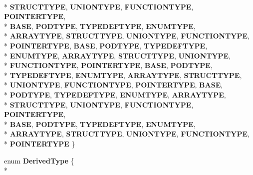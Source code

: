 \begin{DoxyCompactItemize}
\\*
{\bfseries S\-T\-R\-U\-C\-T\-T\-Y\-P\-E}, 
{\bfseries U\-N\-I\-O\-N\-T\-Y\-P\-E}, 
{\bfseries F\-U\-N\-C\-T\-I\-O\-N\-T\-Y\-P\-E}, 
{\bfseries P\-O\-I\-N\-T\-E\-R\-T\-Y\-P\-E}, 
\\*
{\bfseries B\-A\-S\-E}, 
{\bfseries P\-O\-D\-T\-Y\-P\-E}, 
{\bfseries T\-Y\-P\-E\-D\-E\-F\-T\-Y\-P\-E}, 
{\bfseries E\-N\-U\-M\-T\-Y\-P\-E}, 
\\*
{\bfseries A\-R\-R\-A\-Y\-T\-Y\-P\-E}, 
{\bfseries S\-T\-R\-U\-C\-T\-T\-Y\-P\-E}, 
{\bfseries U\-N\-I\-O\-N\-T\-Y\-P\-E}, 
{\bfseries F\-U\-N\-C\-T\-I\-O\-N\-T\-Y\-P\-E}, 
\\*
{\bfseries P\-O\-I\-N\-T\-E\-R\-T\-Y\-P\-E}, 
{\bfseries B\-A\-S\-E}, 
{\bfseries P\-O\-D\-T\-Y\-P\-E}, 
{\bfseries T\-Y\-P\-E\-D\-E\-F\-T\-Y\-P\-E}, 
\\*
{\bfseries E\-N\-U\-M\-T\-Y\-P\-E}, 
{\bfseries A\-R\-R\-A\-Y\-T\-Y\-P\-E}, 
{\bfseries S\-T\-R\-U\-C\-T\-T\-Y\-P\-E}, 
{\bfseries U\-N\-I\-O\-N\-T\-Y\-P\-E}, 
\\*
{\bfseries F\-U\-N\-C\-T\-I\-O\-N\-T\-Y\-P\-E}, 
{\bfseries P\-O\-I\-N\-T\-E\-R\-T\-Y\-P\-E}, 
{\bfseries B\-A\-S\-E}, 
{\bfseries P\-O\-D\-T\-Y\-P\-E}, 
\\*
{\bfseries T\-Y\-P\-E\-D\-E\-F\-T\-Y\-P\-E}, 
{\bfseries E\-N\-U\-M\-T\-Y\-P\-E}, 
{\bfseries A\-R\-R\-A\-Y\-T\-Y\-P\-E}, 
{\bfseries S\-T\-R\-U\-C\-T\-T\-Y\-P\-E}, 
\\*
{\bfseries U\-N\-I\-O\-N\-T\-Y\-P\-E}, 
{\bfseries F\-U\-N\-C\-T\-I\-O\-N\-T\-Y\-P\-E}, 
{\bfseries P\-O\-I\-N\-T\-E\-R\-T\-Y\-P\-E}, 
{\bfseries B\-A\-S\-E}, 
\\*
{\bfseries P\-O\-D\-T\-Y\-P\-E}, 
{\bfseries T\-Y\-P\-E\-D\-E\-F\-T\-Y\-P\-E}, 
{\bfseries E\-N\-U\-M\-T\-Y\-P\-E}, 
{\bfseries A\-R\-R\-A\-Y\-T\-Y\-P\-E}, 
\\*
{\bfseries S\-T\-R\-U\-C\-T\-T\-Y\-P\-E}, 
{\bfseries U\-N\-I\-O\-N\-T\-Y\-P\-E}, 
{\bfseries F\-U\-N\-C\-T\-I\-O\-N\-T\-Y\-P\-E}, 
{\bfseries P\-O\-I\-N\-T\-E\-R\-T\-Y\-P\-E}, 
\\*
{\bfseries B\-A\-S\-E}, 
{\bfseries P\-O\-D\-T\-Y\-P\-E}, 
{\bfseries T\-Y\-P\-E\-D\-E\-F\-T\-Y\-P\-E}, 
{\bfseries E\-N\-U\-M\-T\-Y\-P\-E}, 
\\*
{\bfseries A\-R\-R\-A\-Y\-T\-Y\-P\-E}, 
{\bfseries S\-T\-R\-U\-C\-T\-T\-Y\-P\-E}, 
{\bfseries U\-N\-I\-O\-N\-T\-Y\-P\-E}, 
{\bfseries F\-U\-N\-C\-T\-I\-O\-N\-T\-Y\-P\-E}, 
\\*
{\bfseries P\-O\-I\-N\-T\-E\-R\-T\-Y\-P\-E}
 \}
\item 
enum {\bfseries Derived\-Type} \{ \\*

\end{DoxyCompactItemize}
